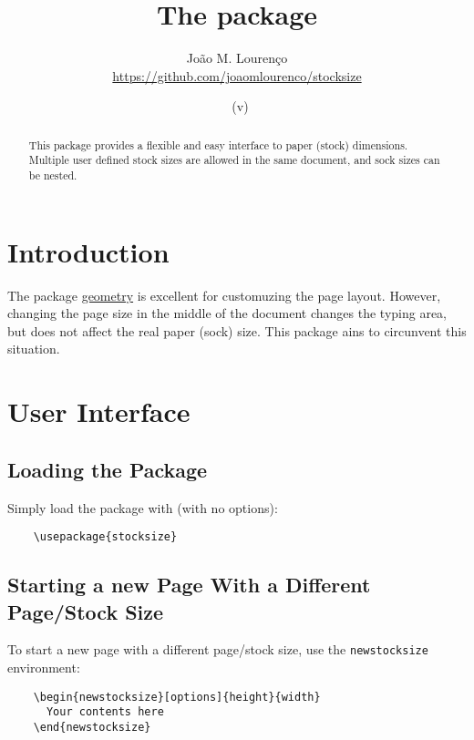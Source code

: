 \documentclass[12pt,a4paper]{article}
\begin{document}
  \title{The \textsf{\filename} package}
  \author{João M. Lourenço\\\url{https://github.com/joaomlourenco/stocksize}}
  \date{\filedate\ (v\fileversion)}
  
  \maketitle
  
  \begin{abstract}
    This package provides a flexible and easy interface to paper (stock) dimensions.
    Multiple user defined stock sizes are allowed in the same document, and sock sizes can be nested.
  \end{abstract}
  
\section{Introduction}
  
  The package 
    \href{https://github.com/davidcarlisle/geometry}{geometry} 
is excellent for customuzing the page layout.  However, changing the page size in the middle of the document changes the typing area, but does not affect the real paper (sock) size.  This package ains to circunvent this situation.

\section{User Interface}
  
\subsection{Loading the Package}
  
  Simply load the package with (with no options):
  
  \begin{verbatim}
    \usepackage{stocksize}
  \end{verbatim}
  
\subsection{Starting a new Page With a Different Page/Stock Size}
  
  To start a new page with a different page/stock size, use the \verb!newstocksize! environment:
  
  \begin{verbatim}
    \begin{newstocksize}[options]{height}{width}
      Your contents here
    \end{newstocksize}
  \end{verbatim}
  
\end{document}
